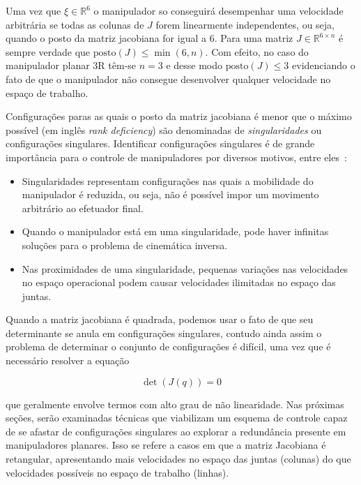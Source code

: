 Uma vez que \(\xi \in \mathbb{R}^6\) o manipulador so conseguirá desempenhar
uma velocidade arbitrária se todas as colunas de \(J\) forem linearmente
independentes, ou seja, quando o posto da matriz jacobiana for igual a \(6\).
Para uma matriz \(J \in \mathbb{R}^{6 \times n}\) é sempre verdade que
\(\text{posto}(J) \leq \min(6, n)\). Com efeito, no caso do manipulador planar
3R têm-se \(n = 3\) e desse modo \(\text{posto}(J) \leq 3\) evidenciando o
fato de que o manipulador não consegue desenvolver qualquer velocidade no
espaço de trabalho.

Configurações paras as quais o posto da matriz jacobiana é menor que o máximo
possível (em inglês \emph{rank deficiency}) são denominadas de
\emph{singularidades} ou configurações singulares. Identificar configurações
singulares é de grande importância para o controle de manipuladores por
diversos motivos, entre eles~\cite{spong_robot_2020}:

\begin{itemize}
    \item Singularidades representam configurações nas quais a mobilidade do manipulador
          é reduzida, ou seja, não é possível impor um movimento arbitrário ao efetuador
          final.
    \item Quando o manipulador está em uma singularidade, pode haver infinitas soluções
          para o problema de cinemática inversa.
    \item Nas proximidades de uma singularidade, pequenas variações nas velocidades no
          espaço operacional podem causar velocidades ilimitadas no espaço das juntas.
\end{itemize}

Quando a matriz jacobiana é quadrada, podemos usar o fato de que seu
determinante se anula em configurações singulares, contudo ainda assim o
problema de determinar o conjunto de configurações é difícil, uma vez que é necessário
resolver a equação

\begin{equation}
    \det(J(q)) = 0
\end{equation}

que geralmente envolve termos com alto grau de não linearidade. Nas próximas
seções, serão examinadas técnicas que viabilizam um esquema de controle capaz de se
afastar de configurações singulares ao explorar a redundância presente em
manipuladores planares. Isso se refere a casos em que a matriz Jacobiana é
retangular, apresentando mais velocidades no espaço das juntas (colunas) do que
velocidades possíveis no espaço de trabalho (linhas).

